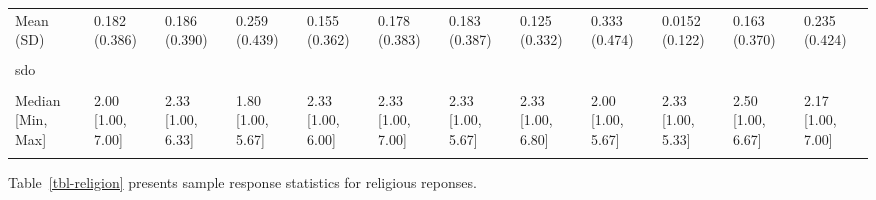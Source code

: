 \documentclass[
  single column]{article}
\begin{document}
\begin{landscape}
\begin{longtable}[t]{llllllllllll}
\addlinespace
Mean (SD) & 0.182 (0.386) & 0.186 (0.390) & 0.259 (0.439) & 0.155 (0.362) & 0.178 (0.383) & 0.183 (0.387) & 0.125 (0.332) & 0.333 (0.474) & 0.0152 (0.122) & 0.163 (0.370) & 0.235 (0.424)\\
\cellcolor{gray!10}{Median [Min, Max]} & \cellcolor{gray!10}{0 [0, 1.00]} & \cellcolor{gray!10}{0 [0, 1.00]} & \cellcolor{gray!10}{0 [0, 1.00]} & \cellcolor{gray!10}{0 [0, 1.00]} & \cellcolor{gray!10}{0 [0, 1.00]} & \cellcolor{gray!10}{0 [0, 1.00]} & \cellcolor{gray!10}{0 [0, 1.00]} & \cellcolor{gray!10}{0 [0, 1.00]} & \cellcolor{gray!10}{0 [0, 1.00]} & \cellcolor{gray!10}{0 [0, 1.00]} & \cellcolor{gray!10}{0 [0, 1.00]}\\
sdo &  &  &  &  &  &  &  &  &  &  & \\
\cellcolor{gray!10}{Mean (SD)} & \cellcolor{gray!10}{2.16 (0.963)} & \cellcolor{gray!10}{2.47 (0.986)} & \cellcolor{gray!10}{1.99 (0.960)} & \cellcolor{gray!10}{2.38 (0.969)} & \cellcolor{gray!10}{2.37 (0.966)} & \cellcolor{gray!10}{2.41 (0.943)} & \cellcolor{gray!10}{2.45 (1.03)} & \cellcolor{gray!10}{2.30 (1.15)} & \cellcolor{gray!10}{2.44 (0.896)} & \cellcolor{gray!10}{2.52 (0.987)} & \cellcolor{gray!10}{2.26 (1.02)}\\
Median [Min, Max] & 2.00 [1.00, 7.00] & 2.33 [1.00, 6.33] & 1.80 [1.00, 5.67] & 2.33 [1.00, 6.00] & 2.33 [1.00, 7.00] & 2.33 [1.00, 5.67] & 2.33 [1.00, 6.80] & 2.00 [1.00, 5.67] & 2.33 [1.00, 5.33] & 2.50 [1.00, 6.67] & 2.17 [1.00, 7.00]\\
\addlinespace
\cellcolor{gray!10}{Missing} & \cellcolor{gray!10}{1 (0.0\%)} & \cellcolor{gray!10}{2 (0.1\%)} & \cellcolor{gray!10}{0 (0\%)} & \cellcolor{gray!10}{2 (0.1\%)} & \cellcolor{gray!10}{6 (0.2\%)} & \cellcolor{gray!10}{1 (0.1\%)} & \cellcolor{gray!10}{1 (0.7\%)} & \cellcolor{gray!10}{0 (0\%)} & \cellcolor{gray!10}{0 (0\%)} & \cellcolor{gray!10}{1 (0.2\%)} & \cellcolor{gray!10}{1 (0.1\%)}\\*

\end{longtable}

\endgroup{}


\end{landscape}

\newpage{}

\newpage{}

Table~\ref{tbl-religion} presents sample response statistics for
religious reponses.
\end{document}
